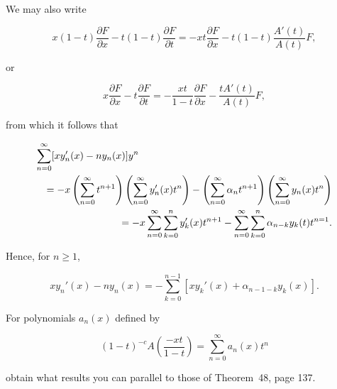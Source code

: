 \begin{solution}
We may also write

$$x(1-t) \dfrac{\partial F}{\partial x} - t(1-t) \dfrac{\partial F}{\partial t} = -xt \dfrac{\partial F}{\partial x} - t(1-t) \dfrac{A'(t)}{A(t)} F,$$

or

$$x \dfrac{\partial F}{\partial x} - t \dfrac{\partial F}{\partial t} = - \dfrac{xt}{1-t} \dfrac{\partial F}{\partial x} - \dfrac{t A'(t)}{A(t)} F,$$

from which it follows that

\begin{eqnarray*}
\lefteqn{\displaystyle\sum_{n=0}^{\infty} [x y_n'(x) - ny_n(x)] y^n} \\
& &= - x \left( \displaystyle\sum_{n=0}^{\infty} t^{n+1} \right) \left( \displaystyle\sum_{n=0}^{\infty} y_n'(x) t^n \right) - \left( \displaystyle\sum_{n=0}^{\infty} \alpha_n t^{n+1} \right) \left( \displaystyle\sum_{n=0}^{\infty} y_n(x) t^n \right) \\
& &= -x \displaystyle\sum_{n=0}^{\infty} \displaystyle\sum_{k=0}^n y_k'(x) t^{n+1} - \displaystyle\sum_{n=0}^{\infty} \displaystyle\sum_{k=0}^n \alpha_{n-k} y_k(t) t^{n=1}.
\end{eqnarray*}

Hence, for $n \geq 1$,

$$x y_n'(x) - ny_n(x) = - \displaystyle\sum_{k=0}^{n-1} [x y_k'(x) + \alpha_{n-1-k} y_k(x)].$$
\end{solution}
\begin{problem}\label{problem9chapter8}
For polynomials $a_n(x)$ defined by

$$(1-t)^{-c} A \left( \dfrac{-xt}{1-t} \right) = \displaystyle\sum_{n=0}^{\infty} a_n(x) t^n$$

obtain what results you can parallel to those of Theorem~48, page 137.
\end{problem}
